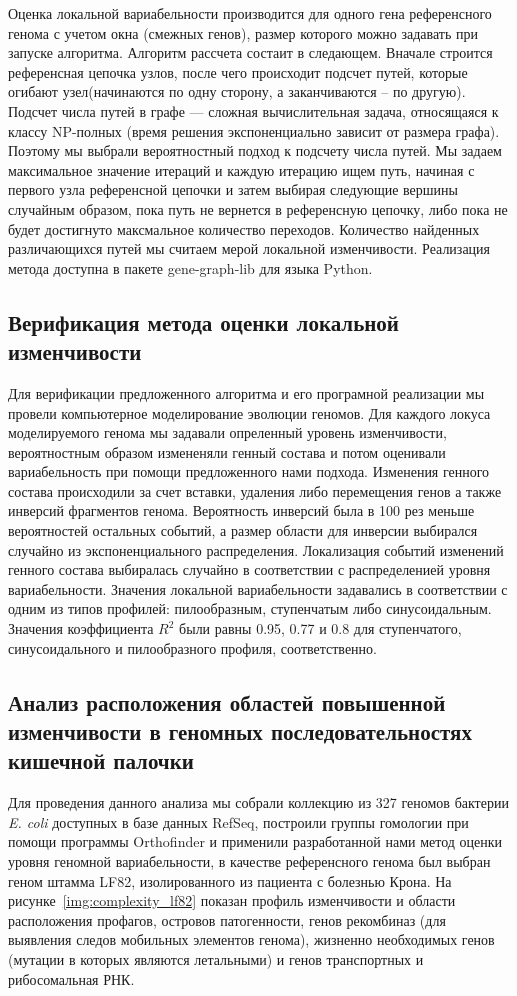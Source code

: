 Оценка локальной вариабельности производится для одного гена референсного генома с учетом окна (смежных генов), размер которого можно задавать при запуске алгоритма. Алгоритм рассчета состаит в следающем. Вначале строится референсная цепочка узлов, после чего происходит подсчет путей, которые огибают узел(начинаются по одну сторону, а заканчиваются -- по другую). Подсчет числа путей в графе --- сложная вычислительная задача, относящаяся к классу NP-полных (время решения экспоненциально зависит от размера графа). Поэтому мы выбрали вероятностный подход к подсчету числа путей. Мы задаем максимальное значение итераций и каждую итерацию ищем путь, начиная с первого узла референсной цепочки и затем выбирая следующие вершины случайным образом, пока путь не вернется в референсную цепочку, либо пока не будет достигнуто максмальное количество переходов. Количество найденных различающихся путей мы считаем мерой локальной изменчивости. Реализация метода доступна в пакете gene-graph-lib для языка Python.

\subsection*{Верификация метода оценки локальной изменчивости}
Для верификации предложенного алгоритма и его програмной реализации мы провели компьютерное моделирование эволюции геномов. Для каждого локуса моделируемого генома мы задавали опреленный уровень изменчивости, вероятностным образом измененяли генный состава и потом оценивали вариабельность при помощи предложенного нами подхода. Изменения генного состава происходили за счет вставки, удаления либо перемещения генов а также инверсий фрагментов генома. Вероятность инверсий была в 100 рез меньше вероятностей остальных событий, а размер области для инверсии выбирался случайно из экспоненциального распределения. Локализация событий изменений генного состава выбиралась случайно в соответствии с распределенией уровня вариабельности. Значения локальной вариабельности задавались в соответствии с одним из типов профилей: пилообразным, ступенчатым либо синусоидальным. Значения коэффициента $R^2$ были равны 0.95, 0.77 и 0.8 для ступенчатого, синусоидального и пилообразного профиля, соответственно. 


\subsection*{Анализ расположения областей повышенной изменчивости в геномных последовательностях кишечной палочки}
Для проведения данного анализа мы собрали коллекцию из 327 геномов бактерии \textit{E. coli} доступных в базе данных RefSeq, построили группы гомологии при помощи программы Orthofinder и применили разработанной нами метод оценки уровня геномной вариабельности, в качестве референсного генома был выбран геном штамма LF82, изолированного из пациента с болезнью Крона. На рисунке~\ref{img:complexity_lf82} показан профиль изменчивости и области расположения профагов, островов патогенности, генов рекомбиназ (для выявления следов мобильных элементов генома), жизненно необходимых генов (мутации в которых являются летальными) и генов транспортных и рибосомальная РНК.

